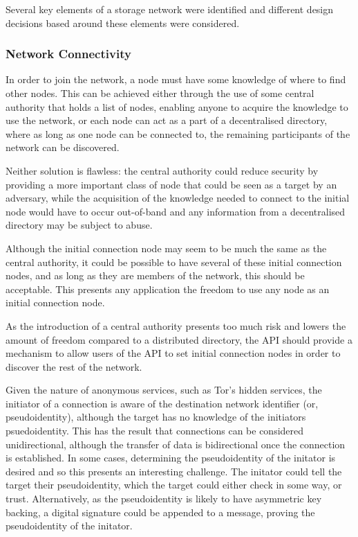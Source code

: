 Several key elements of a storage network were identified and different design decisions based around these elements were considered. 
		
		\subsubsection{Network Connectivity}
			In order to join the network, a node must have some knowledge of where to find other nodes. This can be achieved either through the use of some central authority that holds a list of nodes, enabling anyone to acquire the knowledge to use the network, or each node can act as a part of a decentralised directory, where as long as one node can be connected to, the remaining participants of the network can be discovered.
			
			Neither solution is flawless: the central authority could reduce security by providing a more important class of node that could be seen as a target by an adversary, while the acquisition of the knowledge needed to connect to the initial node would have to occur out-of-band and any information from a decentralised directory may be subject to abuse.
			
			Although the initial connection node may seem to be much the same as the central authority, it could be possible to have several of these initial connection nodes, and as long as they are members of the network, this should be acceptable. This presents any application the freedom to use any node as an initial connection node.
			
			As the introduction of a central authority presents too much risk and lowers the amount of freedom compared to a distributed directory, the API should provide a mechanism to allow users of the API to set initial connection nodes in order to discover the rest of the network.
			
			Given the nature of anonymous services, such as Tor's hidden services, the initiator of a connection is aware of the destination network identifier (or, pseudoidentity), although the target has no knowledge of the initiators psuedoidentity. This has the result that connections can be considered unidirectional, although the transfer of data is bidirectional once the connection is established. In some cases, determining the pseudoidentity of the initator is desired and so this presents an interesting challenge. The initator could tell the target their pseudoidentity, which the target could either check in some way, or trust. Alternatively, as the pseudoidentity is likely to have asymmetric key backing, a digital signature could be appended to a message, proving the pseudoidentity of the initator. 
			
